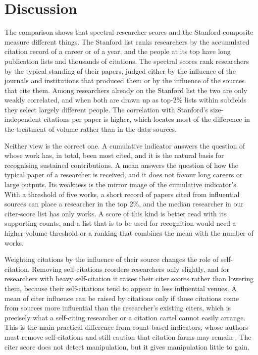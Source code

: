 \section{Discussion}
\label{sec:discussion}

The comparison shows that spectral researcher scores and the Stanford composite measure different things. The Stanford list ranks researchers by the accumulated citation record of a career or of a year, and the people at its top have long publication lists and thousands of citations. The spectral scores rank researchers by the typical standing of their papers, judged either by the influence of the journals and institutions that produced them or by the influence of the sources that cite them. Among researchers already on the Stanford list the two are only weakly correlated, and when both are drawn up as top-2\% lists within subfields they select largely different people. The correlation with Stanford's size-independent citations per paper is higher, which locates most of the difference in the treatment of volume rather than in the data sources.

Neither view is the correct one. A cumulative indicator answers the question of whose work has, in total, been most cited, and it is the natural basis for recognising sustained contributions. A mean answers the question of how the typical paper of a researcher is received, and it does not favour long careers or large outputs. Its weakness is the mirror image of the cumulative indicator's. With a threshold of five works, a short record of papers cited from influential sources can place a researcher in the top 2\%, and the median researcher in our citer-score list has only \NTopMedWorksCit{} works. A score of this kind is better read with its supporting counts, and a list that is to be used for recognition would need a higher volume threshold or a ranking that combines the mean with the number of works.

Weighting citations by the influence of their source changes the role of self-citation. Removing self-citations reorders researchers only slightly, and for researchers with heavy self-citation it raises their citer scores rather than lowering them, because their self-citations tend to appear in less influential venues. A mean of citer influence can be raised by citations only if those citations come from sources more influential than the researcher's existing citers, which is precisely what a self-citing researcher or a citation cartel cannot easily arrange. This is the main practical difference from count-based indicators, whose authors must remove self-citations and still caution that citation farms may remain \citep{ioannidisStandardizedCitationMetrics2019a}. The citer score does not detect manipulation, but it gives manipulation little to gain.

